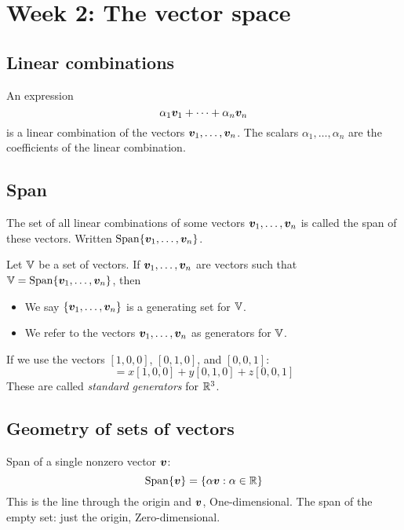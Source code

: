 \chapter{Week 2: The vector space}

\section{Linear combinations}
\begin{definition}
  An expression
  \begin{equation*}
    \alpha_1{\bm{v}}_1 + \cdots + \alpha_n{\bm{v}}_n
  \end{equation*}
  is a linear combination of the vectors ${\bm{v}}_1, \ldots, {\bm{v}}_n$.
  The scalars $\alpha_1, \ldots, \alpha_n$ are the coefficients of the linear combination.
\end{definition}


\section{Span}
\begin{definition}[Span]
  The set of all linear combinations of some vectors ${\bm{v}}_1, \ldots, {\bm{v}}_n$ is called the span of these vectors. Written $\mathrm{Span}\{{\bm{v}}_1,\ldots,{\bm{v}}_n\}$.
\end{definition}

\begin{definition}
  Let ${\mathbb{V}}$ be a set of vectors. If ${\bm{v}}_1, \ldots, {\bm{v}}_n$ are vectors such that ${\mathbb{V}} = \mathrm{Span}\{ {\bm{v}}_1, \ldots, {\bm{v}}_n \}$, then
  \begin{itemize}
  \item We say $\{ {\bm{v}}_1, \ldots, {\bm{v}}_n \}$ is a generating set for ${\mathbb{V}}$.
  \item We refer to the vectors ${\bm{v}}_1, \ldots, {\bm{v}}_n$ as generators for ${\mathbb{V}}$.
  \end{itemize}
\end{definition}

If we use the vectors $[1, 0, 0]$, $[0, 1, 0]$, and $[0, 0, 1]$:
\begin{equation*}
  [x, y, z] = x[1, 0, 0] + y[0, 1, 0] + z[0, 0, 1]
\end{equation*}
These are called \emph{standard generators} for $\mathbb{R}^3$.


\section{Geometry of sets of vectors}
Span of a single nonzero vector ${\bm{v}}$:
\begin{equation*}
  \mathrm{Span}\{{\bm{v}}\} = \{ \alpha{\bm{v}} : \alpha\in\mathbb{R} \}
\end{equation*}
This is the line through the origin and ${\bm{v}}$, One-dimensional. The span of the empty set: just the origin, Zero-dimensional.

